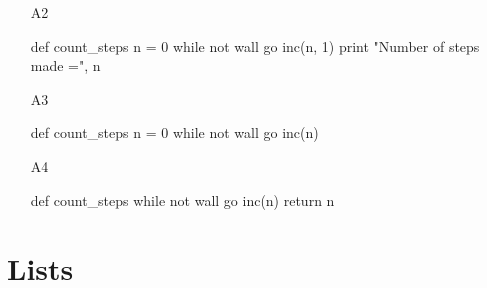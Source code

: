 \begin{enumerate}
\begin{enumerate}
\begin{bluecode}
\end{bluecode}
\item[A2] 
\begin{bluecode}
def count_steps
    n = 0
    while not wall
        go
        inc(n, 1)
    print "Number of steps made =", n
\end{bluecode}
\item[A3] 
\begin{bluecode}
def count_steps
    n = 0
    while not wall
        go
        inc(n)
\end{bluecode}
\item[A4] 
\begin{bluecode}
def count_steps
    while not wall
        go
        inc(n)
    return n
\end{bluecode}
\end{enumerate}
\end{enumerate}


\section{Lists}

